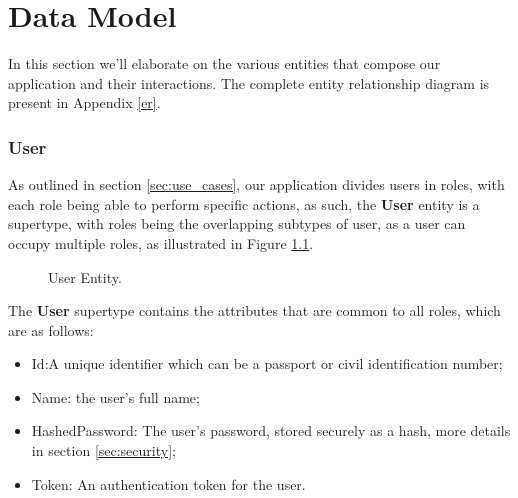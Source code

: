 %
%
\chapter{Data Model}\label{cap:data_model}
In this section we'll elaborate on the various entities that compose our application and their interactions.
The complete entity relationship diagram is present in Appendix \ref{er}.

\subsection{User}

As outlined in section \ref{sec:use_cases}, our application divides users in roles, with each role being able to perform specific actions, as such, the \textbf{User} entity is a supertype, with roles being the overlapping subtypes of user, as a user can occupy multiple roles, as illustrated in Figure \ref{fig:user_entity}.

\begin{figure}[h]
	\begin{center}
	\end{center}
	\caption{User Entity.}\label{fig:user_entity}
\end{figure}

The \textbf{User} supertype contains the attributes that are common to all roles, which are as follows:

\begin{itemize}
	\item Id:A unique identifier which can be a passport or civil identification number;
	\item Name: the user's full name;
	\item HashedPassword: The user's password, stored securely as a hash, more details in section \ref{sec:security};
	\item Token: An authentication token for the user.
\end{itemize}

